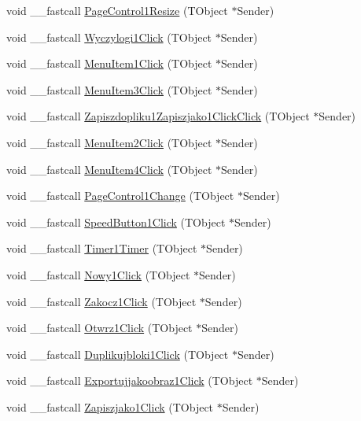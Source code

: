 \begin{CompactItemize}
\item 
void \_\-\_\-fastcall \hyperlink{classTForm1_327201e8ba2ffe5f8a866306f4ab602d}{PageControl1Resize} (TObject $\ast$Sender)
\item 
void \_\-\_\-fastcall \hyperlink{classTForm1_1c7229a551faa6b9095eb523b0843122}{Wyczylogi1Click} (TObject $\ast$Sender)
\item 
void \_\-\_\-fastcall \hyperlink{classTForm1_2f1df2a24662cbe737ae88633dbdcbc2}{MenuItem1Click} (TObject $\ast$Sender)
\item 
void \_\-\_\-fastcall \hyperlink{classTForm1_c43ab1208fdd1700242479091fa54bfa}{MenuItem3Click} (TObject $\ast$Sender)
\item 
void \_\-\_\-fastcall \hyperlink{classTForm1_aa65d93be5f8ead0aa96f29accddb0a8}{Zapiszdopliku1Zapiszjako1ClickClick} (TObject $\ast$Sender)
\item 
void \_\-\_\-fastcall \hyperlink{classTForm1_aa4a9501874d8b9736ef9c6ab19d93da}{MenuItem2Click} (TObject $\ast$Sender)
\item 
void \_\-\_\-fastcall \hyperlink{classTForm1_1c52133d24858202380937319bed525c}{MenuItem4Click} (TObject $\ast$Sender)
\item 
void \_\-\_\-fastcall \hyperlink{classTForm1_9830055131dd01fedd0c8212edec6a9b}{PageControl1Change} (TObject $\ast$Sender)
\item 
void \_\-\_\-fastcall \hyperlink{classTForm1_cfd8fc7d5e071f91d545cf71cd3e525c}{SpeedButton1Click} (TObject $\ast$Sender)
\item 
void \_\-\_\-fastcall \hyperlink{classTForm1_bc9c59c8c54a39ff8b9a8b1a8facdfde}{Timer1Timer} (TObject $\ast$Sender)
\item 
void \_\-\_\-fastcall \hyperlink{classTForm1_49836e6b4443972a738957868beb5894}{Nowy1Click} (TObject $\ast$Sender)
\item 
void \_\-\_\-fastcall \hyperlink{classTForm1_6ecd2685a5128166bd573ff3ebe1b37d}{Zakocz1Click} (TObject $\ast$Sender)
\item 
void \_\-\_\-fastcall \hyperlink{classTForm1_f63d66a27ca087cc5997b90fe1e2cec0}{Otwrz1Click} (TObject $\ast$Sender)
\item 
void \_\-\_\-fastcall \hyperlink{classTForm1_905eccb6be3dfda63ebceb962004286f}{Duplikujbloki1Click} (TObject $\ast$Sender)
\item 
void \_\-\_\-fastcall \hyperlink{classTForm1_f8d02d580dfa34c21232b663bac20e69}{Exportujjakoobraz1Click} (TObject $\ast$Sender)
\item 
void \_\-\_\-fastcall \hyperlink{classTForm1_892e5a861ee39447c901bda936774a66}{Zapiszjako1Click} (TObject $\ast$Sender)

\end{CompactItemize}
